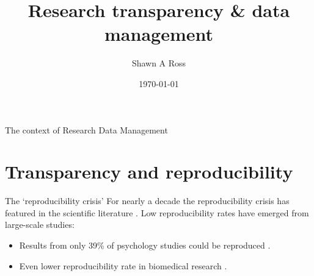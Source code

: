 \documentclass[aspectratio=169, 12pt]{beamer} %
\title{Research transparency \& data management} %
\author{Shawn A Ross}               %
\institute{Office of the Deputy Vice-Chancellor (Research)}         %
\date{\today}                 %
\begin{document}

\maketitle

  

\begin{frame}{The context of Research Data Management}
  \tableofcontents
\end{frame}

%



\section{Transparency and reproducibility}

\begin{frame}{The `reproducibility crisis'}
  For nearly a decade the reproducibility crisis has featured in the scientific literature \cite{Jasny2011-bw, Baker2016-cf, Munafo2017-bj}. Low reproducibility rates have emerged from large-scale studies:
    \begin{itemize}[label=\textbullet]
        \item Results from only 39\% of psychology studies could be reproduced \cite{Open_Science_Collaboration2015-vf}.
        \item Even lower reproducibility rate in biomedical research \cite{Begley2012-xt,Prinz2011-za}.
    \end{itemize}
\end{frame}
\end{document}

